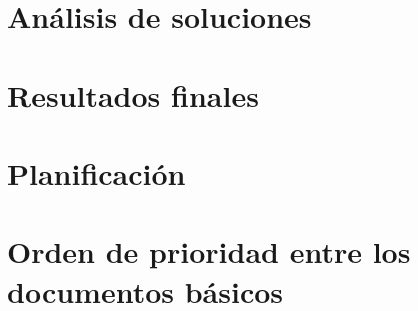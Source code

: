\documentclass[main]{subfiles}
\begin{document}
\section{Análisis de soluciones}

\section{Resultados finales}

\section{Planificación}

\section{Orden de prioridad entre los documentos básicos}

\end{document}
